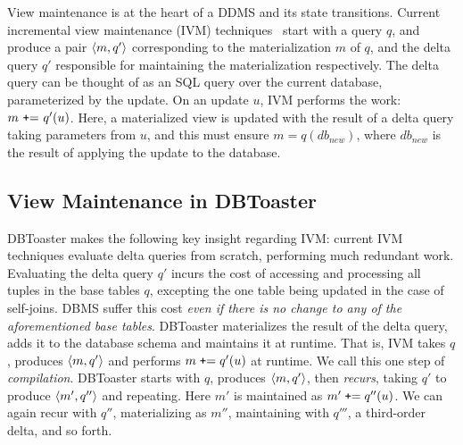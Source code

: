 \label{sec:compilation}

View maintenance is at the heart of a DDMS and its state transitions. Current
incremental view maintenance (IVM)
techniques~\cite{roussopoulos-tods:91,griffin-sigmod:95,zhou-icde:07,zhou-vldb:07}
start with a query $q$, and produce a pair ${\langle m,q'\rangle}$ corresponding to the
materialization $m$ of $q$, and the delta query $q'$ responsible for maintaining the
materialization respectively. The delta query can be thought of as an
SQL query over the current database, parameterized by the update.
On an update $u$, IVM performs the work: $m \mbox{
{\tt+}= } q'(u)$. Here, a materialized view is updated with the result of a
delta query taking parameters from $u$, and this must ensure $m = q(db_{new})$,
where $db_{new}$ is the result of applying the update to the database.

\subsection{View Maintenance in DBToaster}
DBToaster makes the following key insight regarding IVM: current IVM techniques
evaluate delta queries from scratch, performing much redundant work. Evaluating
the delta query $q'$ incurs the cost of accessing and processing all tuples in
the base tables $q$, excepting the one table being updated in the case of
self-joins. DBMS suffer this cost \textit{even if there is no change to any of
the aforementioned base tables}. DBToaster materializes the result of the delta
query, adds it to the database schema and maintains it at runtime.
That is, IVM takes $q$, produces ${\langle m,q'\rangle}$ and performs
$m \; \mbox{{\tt +}=} \; q'(u)$ at runtime. We call this one step of
\textit{compilation}. DBToaster starts with $q$, produces
${\langle m,q'\rangle}$, then \textit{recurs}, taking $q'$ to produce ${\langle m', q''\rangle}$
and repeating. Here $m'$ is maintained as $m' \; \mbox{{\tt +}=} \; q''(u)$.
We can again recur with $q''$, materializing as $m''$, maintaining with
$q'''$, a third-order delta, and so forth.


